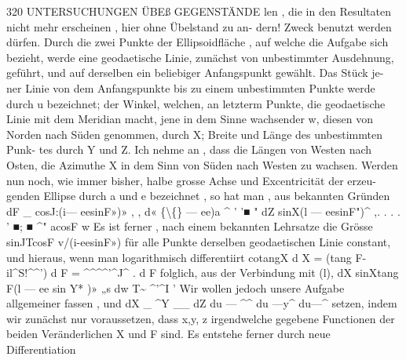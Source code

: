 \documentclass[12pt,a4paper]{article}
\begin{document}
320  UNTERSUCHUNGEN  ÜBEß  GEGENSTÄNDE len ,  die  in  den  Resultaten  nicht  mehr  erscheinen ,  hier  ohne  Übelstand  zu  an- dern! Zweck  benutzt  werden  dürfen. Durch  die  zwei  Punkte  der  Ellipsoidfläche ,  auf  welche  die  Aufgabe  sich bezieht,  werde  eine  geodaetische  Linie,  zunächst  von  unbestimmter  Ausdehnung, geführt,  und  auf  derselben  ein  beliebiger  Anfangspunkt  gewählt.  Das  Stück  je- ner Linie  von  dem  Anfangspunkte  bis  zu  einem  unbestimmten  Punkte  werde  durch u  bezeichnet;  der  Winkel,  welchen,  an  letzterm  Punkte,  die  geodaetische  Linie mit  dem  Meridian  macht,  jene  in  dem  Sinne  wachsender  w,  diesen  von  Norden nach  Süden  genommen,  durch  X;  Breite  und  Länge  des  unbestimmten  Punk- tes durch  Y  und  Z.  Ich  nehme  an ,  dass  die  Längen  von  Westen  nach  Osten, die  Azimuthe  X  in  dem  Sinn  von  Süden  nach  Westen  zu  wachsen.  Werden nun  noch,  wie  immer  bisher,  halbe  grosse  Achse  und  Excentricität  der  erzeu- genden Ellipse  durch  a  und  e  bezeichnet ,   so  hat  man ,  aus  bekannten  Gründen dF    \_  cosJ:(i--- eesinF»)»  ,    , d«  \{\textbackslash\{\}  ---  ee)a \^{}    ' '■      "                                                           dZ       sinX(l  --- eesinF")\^{}  ,. .  .      .   '   ■;    ■  \^{}"  acosF w Es  ist  ferner ,  nach  einem  bekannten  Lehrsatze  die  Grösse sinJTcosF v/(i-eesinF») für  alle  Punkte  derselben  geodaetischen  Linie  constant,  und  hieraus,  wenn  man logarithmisch  differentiirt cotangX  d  X  =  (tang  F-  il\^{}S!\^{}\^{}')  d  F  =  \^{}\^{}\^{}\^{}'\^{}J\^{} .  d  F folglich,  aus  der  Verbindung  mit  (l), dX    sinXtang  F(l  ---  ee  sin  Y* )»  „s dw   T\textasciitilde{} \^{}'\^{}I '     Wir  wollen  jedoch  unsere  Aufgabe  allgemeiner  fassen  ,  und dX  \_  \^{}Y  \_\_  dZ du  ---  \^{}\^{}    du  ---y\^{}    du---\^{} setzen,  indem  wir  zunächst  nur  voraussetzen,  dass  x,y,  z  irgendwelche  gegebene Functionen  der  beiden  Veränderlichen  X  und  F  sind.  Es  entstehe  ferner  durch neue  Differentiation
\end{document}
